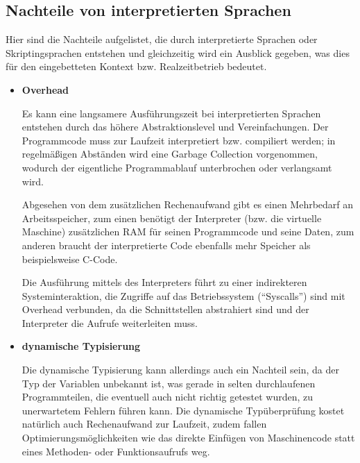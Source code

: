 \subsection{Nachteile von interpretierten Sprachen}


Hier sind die Nachteile aufgelistet, die durch interpretierte Sprachen oder
Skriptingsprachen entstehen und gleichzeitig wird ein Ausblick gegeben, was
dies für den eingebetteten Kontext bzw. Realzeitbetrieb bedeutet.


\begin{itemize}

  \item \textbf{Overhead}

        Es kann eine langsamere Ausführungszeit bei interpretierten Sprachen
        entstehen durch das höhere Abstraktionslevel und Vereinfachungen.
        Der Programmcode muss zur Laufzeit interpretiert bzw. compiliert
        werden; in regelmäßigen Abständen wird eine Garbage Collection
        vorgenommen, wodurch der eigentliche Programmablauf unterbrochen oder
        verlangsamt wird.

        Abgesehen von dem zusätzlichen Rechenaufwand gibt es einen Mehrbedarf
        an Arbeitsspeicher, zum einen benötigt der Interpreter (bzw. die
        virtuelle Maschine) zusätzlichen RAM für seinen Programmcode und seine
        Daten, zum anderen braucht der interpretierte Code ebenfalls mehr
        Speicher als beispielsweise C-Code.

        Die Ausführung mittels des Interpreters führt zu einer indirekteren
        Systeminteraktion, die Zugriffe auf das Betriebssystem (“Syscalls”)
        sind mit Overhead verbunden, da die Schnittstellen abstrahiert sind
        und der Interpreter die Aufrufe weiterleiten muss.

  \item \textbf{dynamische Typisierung}

        Die dynamische Typisierung kann allerdings auch ein Nachteil sein,
        da der Typ der Variablen unbekannt ist, was gerade in selten
        durchlaufenen Programmteilen, die eventuell auch nicht richtig
        getestet wurden, zu unerwartetem Fehlern führen kann. Die dynamische
        Typüberprüfung kostet natürlich auch Rechenaufwand zur Laufzeit,
        zudem fallen Optimierungsmöglichkeiten wie das direkte Einfügen von
        Maschinencode statt eines Methoden- oder Funktionsaufrufs weg.

\end{itemize}


